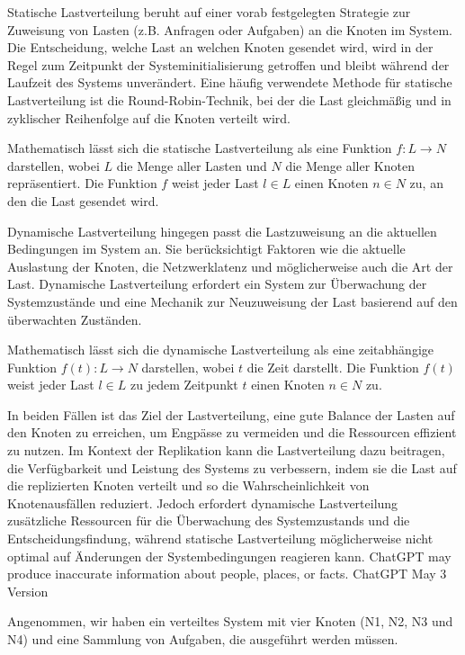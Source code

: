 Statische Lastverteilung beruht auf einer vorab festgelegten Strategie zur Zuweisung von Lasten (z.B. Anfragen oder Aufgaben) an die Knoten im System. Die Entscheidung, welche Last an welchen Knoten gesendet wird, wird in der Regel zum Zeitpunkt der Systeminitialisierung getroffen und bleibt während der Laufzeit des Systems unverändert. Eine häufig verwendete Methode für statische Lastverteilung ist die Round-Robin-Technik, bei der die Last gleichmäßig und in zyklischer Reihenfolge auf die Knoten verteilt wird.

Mathematisch lässt sich die statische Lastverteilung als eine Funktion $f: L \to N$ darstellen, wobei $L$ die Menge aller Lasten und $N$ die Menge aller Knoten repräsentiert. Die Funktion $f$ weist jeder Last $l \in L$ einen Knoten $n \in N$ zu, an den die Last gesendet wird.

Dynamische Lastverteilung hingegen passt die Lastzuweisung an die aktuellen Bedingungen im System an. Sie berücksichtigt Faktoren wie die aktuelle Auslastung der Knoten, die Netzwerklatenz und möglicherweise auch die Art der Last. Dynamische Lastverteilung erfordert ein System zur Überwachung der Systemzustände und eine Mechanik zur Neuzuweisung der Last basierend auf den überwachten Zuständen.

Mathematisch lässt sich die dynamische Lastverteilung als eine zeitabhängige Funktion $f(t): L \to N$ darstellen, wobei $t$ die Zeit darstellt. Die Funktion $f(t)$ weist jeder Last $l \in L$ zu jedem Zeitpunkt $t$ einen Knoten $n \in N$ zu.

In beiden Fällen ist das Ziel der Lastverteilung, eine gute Balance der Lasten auf den Knoten zu erreichen, um Engpässe zu vermeiden und die Ressourcen effizient zu nutzen. Im Kontext der Replikation kann die Lastverteilung dazu beitragen, die Verfügbarkeit und Leistung des Systems zu verbessern, indem sie die Last auf die replizierten Knoten verteilt und so die Wahrscheinlichkeit von Knotenausfällen reduziert. Jedoch erfordert dynamische Lastverteilung zusätzliche Ressourcen für die Überwachung des Systemzustands und die Entscheidungsfindung, während statische Lastverteilung möglicherweise nicht optimal auf Änderungen der Systembedingungen reagieren kann.
ChatGPT may produce inaccurate information about people, places, or facts. ChatGPT May 3 Version

Angenommen, wir haben ein verteiltes System mit vier Knoten (N1, N2, N3 und N4) und eine Sammlung von Aufgaben, die ausgeführt werden müssen.

